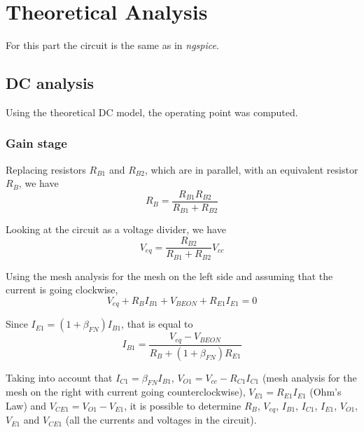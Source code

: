 \section{Theoretical Analysis}
\label{sec:analysis}



For this part the circuit is the same as in \textit{ngspice}.

\subsection{DC analysis}
Using the theoretical DC model, the operating point was computed.


\subsubsection{Gain stage}
Replacing resistors $R_{B1}$ and $R_{B2}$, which are in parallel, with an equivalent resistor $R_{B}$, we have
\begin{equation}
R_B = \frac{R_{B1} R_{B2}}{R_{B1}+R_{B2}}
\end{equation}

Looking at the circuit as a voltage divider, we have
\begin{equation}
V_{eq} = \frac{R_{B2}}{R_{B1}+R_{B2}} V_{cc}
\end{equation}

Using the mesh analysis for the mesh on the left side and assuming that the current is going clockwise,
\begin{equation}
V_{eq} + R_B I_{B1} + V_{BEON} + R_{E1} I_{E1} = 0
\end{equation}

Since $I_{E1} = (1 + \beta_{FN}) I_{B1}$, that is equal to 
\begin{equation}
I_{B1} = \frac{V_{eq}-V_{BEON}}{R_B + (1+\beta_{FN}) R_{E1}}
\end{equation}

Taking into account that $I_{C1} = \beta_{FN} I_{B1}$, $V_{O1} = V_{cc} - R_{C1} I_{C1}$ (mesh analysis for the mesh on the right with current going counterclockwise), $V_{E1} = R_{E1} I_{E1}$ (Ohm's Law) and $V_{CE1} = V_{O1} - V_{E1}$, it is possible to determine $R_B$, $V_{eq}$, $I_{B1}$, $I_{C1}$, $I_{E1}$, $V_{O1}$, $V_{E1}$ and $V_{CE1}$ (all the currents and voltages in the circuit).



